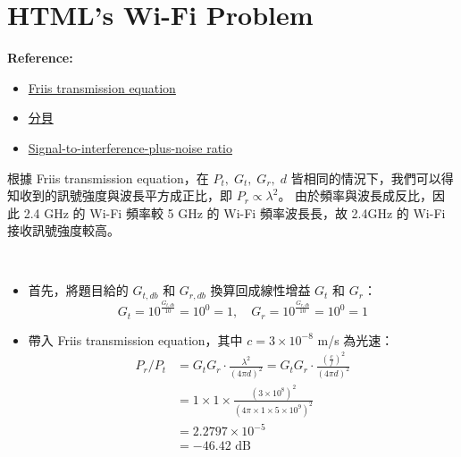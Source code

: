 \documentclass[12pt]{article}
\newenvironment{problem}[2][Problem]{\begin{trivlist}
\item[\hskip \labelsep {\bfseries #1}\hskip \labelsep {\bfseries #2}]}{\end{trivlist}}
\newenvironment{mycolorbox}[1][gray]{
  \renewmdenv[
    linewidth=2pt, linecolor=#1, backgroundcolor=#1!10,
    topline=false, bottomline=false, rightline=false,
    skipabove=10pt, skipbelow=10pt, innerleftmargin=10pt,
    innerrightmargin=0pt, innertopmargin=5pt, innerbottommargin=5pt
  ]{myquote}
  \begin{myquote}
}{\end{myquote}}
\begin{document}
\section{HTML’s Wi-Fi Problem}
\begin{mycolorbox}[teal]
  \textbf{Reference:}
  \footnotesize
  \begin{itemize}
    \item \href{https://en.wikipedia.org/wiki/Friis_transmission_equation}{Friis transmission equation}
    \item \href{https://zh.wikipedia.org/wiki/%E5%88%86%E8%B2%9D}{分貝}
    \item \href{https://en.wikipedia.org/wiki/Signal-to-interference-plus-noise_ratio}{Signal-to-interference-plus-noise ratio}
  \end{itemize}
\end{mycolorbox}
\begin{problem}{1.}
  根據 Friis transmission equation，在 $P_t,\; G_t,\; G_r,\; d$ 皆相同的情況下，我們可以得知收到的訊號強度與波長平方成正比，即 $P_r \propto \lambda^2$。
  由於頻率與波長成反比，因此 2.4 GHz 的 Wi-Fi 頻率較 5 GHz 的 Wi-Fi 頻率波長長，故 2.4GHz 的 Wi-Fi 接收訊號強度較高。
\end{problem}
\begin{problem}{2.} 　
  \begin{itemize}
    \item 首先，將題目給的 $G_{t,db}$ 和 $G_{r,db}$ 換算回成線性增益 $G_t$ 和 $G_r$：
    \[
      G_t = 10^{\frac{G_{t,db}}{10}} = 10^{0} = 1, \quad G_r = 10^{\frac{G_{r,db}}{10}} = 10^{0} = 1
    \]
    \item 帶入 Friis transmission equation，其中 $c = 3\times10^{-8}$ m/s 為光速：
    \begin{align*}
      P_r/P_t &= G_t G_r \cdot \frac{\lambda^2}{(4\pi d)^2} = G_t G_r \cdot \frac{(\frac{c}{f})^2}{(4\pi d)^2} \\
      &= 1 \times 1 \times \frac{(3 \times 10^8)^2}{(4\pi \times 1 \times 5 \times 10^9)^2} \\ 
      &= 2.2797 \times 10^{-5} \\
      &= -46.42 \text{ dB}
    \end{align*}
  \end{itemize}
\end{problem}
\end{document}
